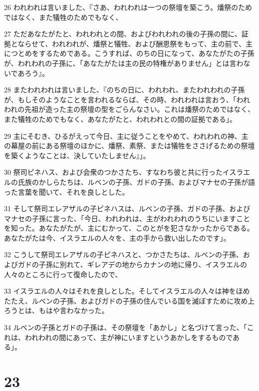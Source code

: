 \par 26 われわれは言いました、『さあ、われわれは一つの祭壇を築こう。燔祭のためではなく、また犠牲のためでもなく、
\par 27 ただあなたがたと、われわれとの間、およびわれわれの後の子孫の間に、証拠とならせて、われわれが、燔祭と犠牲、および酬恩祭をもって、主の前で、主につとめをするためである。こうすれば、のちの日になって、あなたがたの子孫が、われわれの子孫に、「あなたがたは主の民の特権がありません」とは言わないであろう』。
\par 28 またわれわれは言いました、『のちの日に、われわれ、またわれわれの子孫が、もしそのようなことを言われるならば、その時、われわれは言おう、「われわれの先祖が造った主の祭壇の型をごらんなさい。これは燔祭のためではなく、また犠牲のためでもなく、あなたがたと、われわれとの間の証拠である」。
\par 29 主にそむき、ひるがえって今日、主に従うことをやめて、われわれの神、主の幕屋の前にある祭壇のほかに、燔祭、素祭、または犠牲をささげるための祭壇を築くようなことは、決していたしません』」。
\par 30 祭司ピネハス、および会衆のつかさたち、すなわち彼と共に行ったイスラエルの氏族のかしらたちは、ルベンの子孫、ガドの子孫、およびマナセの子孫が語った言葉を聞いて、それを良しとした。
\par 31 そして祭司エレアザルの子ピネハスは、ルベンの子孫、ガドの子孫、およびマナセの子孫に言った、「今日、われわれは、主がわれわれのうちにいますことを知った。あなたがたが、主にむかって、このとがを犯さなかったからである。あなたがたは今、イスラエルの人々を、主の手から救い出したのです」。
\par 32 こうして祭司エレアザルの子ピネハスと、つかさたちは、ルベンの子孫、およびガドの子孫に別れて、ギレアデの地からカナンの地に帰り、イスラエルの人々のところに行って復命したので、
\par 33 イスラエルの人々はそれを良しとした。そしてイスラエルの人々は神をほめたたえ、ルベンの子孫、およびガドの子孫の住んでいる国を滅ぼすために攻め上ろうとは、もはや言わなかった。
\par 34 ルベンの子孫とガドの子孫は、その祭壇を「あかし」と名づけて言った、「これは、われわれの間にあって、主が神にいますというあかしをするものである」。

\chapter{23}

